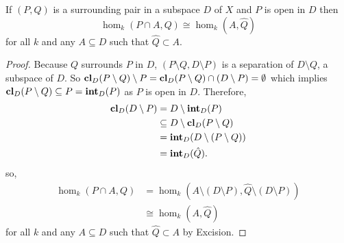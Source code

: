\begin{lemma}\label{lem:excision}
  If $(P, Q)$ is a surrounding pair in a subspace $D$ of $X$ and $P$ is open in $D$ then
  \[ \hom_k(P\cap A, Q) \cong \hom_k(A, \hat{Q}) \]
  for all $k$ and any $A\subseteq D$ such that $\hat{Q}\subset A$.
\end{lemma}
\begin{proof}
  Because $Q$ surrounds $P$ in $D$, $(P\setminus Q, D\setminus P)$ is a separation of $D\setminus Q$, a subspace of $D$.
  So $\mathbf{cl}_D(P\setminus Q)\setminus P = \mathbf{cl}_D(P\setminus Q) \cap (D\setminus P) = \emptyset$ which implies $\mathbf{cl}_D(P\setminus Q)\subseteq P = \mathbf{int}_D(P)$ as $P$ is open in $D$.
  Therefore,
  \begin{align*}
    \mathbf{cl}_D(D\setminus P) &= D\setminus \mathbf{int}_D(P)\\
                        &\subseteq D\setminus \mathbf{cl}_D(P\setminus Q)\\
                        &= \mathbf{int}_D(D\setminus (P\setminus Q))\\
                        &= \mathbf{int}_D(\hat{Q}).
  \end{align*}
  so,
  \begin{align*}
    \hom_k(P\cap A, Q) &= \hom_k(A\setminus (D\setminus P), \hat{Q}\setminus (D\setminus P))\\
      &\cong \hom_k(A, \hat{Q})
  \end{align*}
  for all $k$ and any $A\subseteq D$ such that $\hat{Q}\subset A$ by Excision.
\end{proof}

